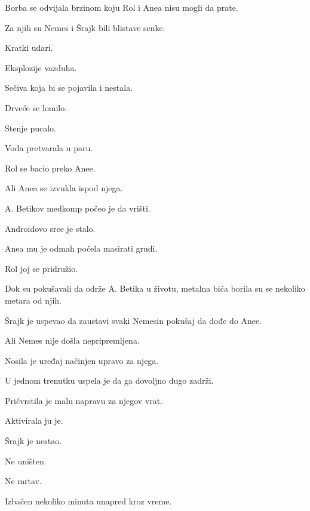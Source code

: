 \bigskip

Borba se odvijala brzinom koju Rol i Anea nisu mogli da prate.

Za njih su Nemes i Šrajk bili blistave senke.

Kratki udari.

Eksplozije vazduha.

Sečiva koja bi se pojavila i nestala.

\bigskip

Drveće se lomilo.

Stenje pucalo.

Voda pretvarala u paru.

\bigskip

Rol se bacio preko Anee.

Ali Anea se izvukla ispod njega.

A. Betikov medkomp počeo je da vrišti.

\bigskip

Androidovo srce je stalo.

\bigskip

Anea mu je odmah počela masirati grudi.

Rol joj se pridružio.

\bigskip

Dok su pokušavali da održe A. Betika u životu, metalna bića borila su se nekoliko metara od njih.

\bigskip

Šrajk je uspevao da zaustavi svaki Nemesin pokušaj da dođe do Anee.

\bigskip

Ali Nemes nije došla nepripremljena.

\bigskip

Nosila je uređaj načinjen upravo za njega.

\bigskip

U jednom trenutku uspela je da ga dovoljno dugo zadrži.

Pričvrstila je malu napravu za njegov vrat.

\bigskip

Aktivirala ju je.

\bigskip

Šrajk je nestao.

\bigskip

Ne uništen.

Ne mrtav.

\bigskip

Izbačen nekoliko minuta unapred kroz vreme.

\bigskip

